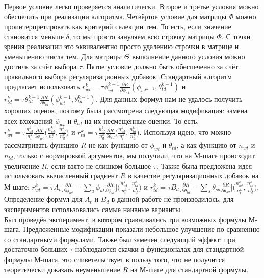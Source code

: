 \documentclass[12pt]{article}
\begin{document}
Первое условие легко проверяется аналитически. Второе и третье условия можно обеспечить при реализации алгоритма. Четвёртое условие для матрицы $\Phi$ можно проинтерпретировать как критерий селекции тем. То есть, если значение становится меньше $\delta$, то мы просто зануляем всю строчку матрицы $\Phi$. С точки зрения реализации это эквивалентно просто удалению строчки в матрице и уменьшению числа тем. Для матрицы $\Theta$ выполнение данного условия можно достичь за счёт выбора $\tau$. Пятое условие должно быть обеспеченно за счёт правильного выбора регуляризационных добавок. Стандартный алгоритм предлагает использовать $r_{wt}^{k} = \tau \phi_{wt}^{k-1} \frac{\partial{R}}{\partial{\phi_{wt}}}(\phi_{wt^{k-1}}, \theta_{td}^{k-1})$ и $r_{td}^{k}=\tau  \theta_{td}^{k-1} \frac{\partial{R}}{\partial{\theta_{td}}}(\phi_{wt}^{k-1}, \theta_{td}^{k-1})$. Для данных формул нам не удалось получить хороших оценок, поэтому была рассмотрена следующая модификация: замена всех вхождений $\phi_{wt}$ и $\theta_{td}$ на их несмещённые оценки. То есть,  $r_{wt}^k= \tau \frac{n^k_{wt}}{n^k_t}\frac{\partial{R}}{\partial{\phi_{wt}}}\bigl(\frac{n^k_{wt}}{n^k_t}, \frac{n^k_{td}}{n^k_d}\bigr)$ и $r_{td}^k= \tau \frac{n^k_{td}}{n^k_d}\frac{\partial{R}}{\partial{\theta_{td}}}\bigl(\frac{n^k_{wt}}{n^k_t}, \frac{n^k_{td}}{n^k_d}\bigr)$. Используя идею, что можно рассматривать функцию $R$ не как функцию от $\phi_{wt}$ и $\theta_{td}$, а как функцию от $n_{wt}$ и $n_{td}$, только с нормировкой аргументов, мы получили, что на М-шаге происходит увеличение $R$, если взято не слишком большое $\tau$. Также была предложена идея использовать вычисленный градиент $R$ в качестве регуляризационных добавок на М-шаге: $r^k_{wt} = \tau A_t \bigl[{\frac{\partial{R}}{\partial{\phi_{wt}}} - \sum\limits_u \phi_{ut} \frac{\partial{R}}{\partial{\phi_{ut}}} }\bigr] \bigl(\frac{n^k_{wt}}{n^k_t}, \frac{n^k_{td}}{n^k_d}\bigr)$ и $r^k_{td} = \tau B_d \bigl[ {\frac{\partial{R}}{\partial{\theta_{td}}} - \sum\limits_s \theta_{sd} \frac{\partial{R}}{\partial{\theta_{sd}}} }\bigr] \bigl(\frac{n^k_{wt}}{n^k_t}, \frac{n^k_{td}}{n^k_d}\bigr)$. Определение формул для $A_t$ и $B_d$ в данной работе не производилось, для экспериментов использовались самые наивные варианты.\\
Был проведён эксперимент, в котором сравнивались три возможных формулы М-шага. Предложенные модификации показали небольшое улучшение по сравнению со стандартными формулами. Также был замечен следующий эффект: при достаточно больших $\tau$ наблюдаются скачки в функционалах для стандартной формулы М-шага, это сливетельствует в пользу того, что не получится теоретически доказать неуменьшение $R$ на М-шаге для стандартной формулы.\\
\end{document}
